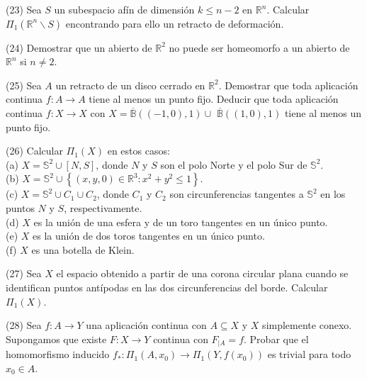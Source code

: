 \documentclass[
  a4paper,
  spanish,
  12pt,
]{scrartcl}
\begin{document}
\begin{ejer}
(23) Sea $S$ un subespacio afín de dimensión $k \leq n-2$ en $\mathbb{R}^{n}$. Calcular $\Pi_{1}\left(\mathbb{R}^{n} \backslash S\right)$ encontrando para ello un retracto de deformación.\\
\end{ejer}

\begin{ejer}
(24) Demostrar que un abierto de $\mathbb{R}^{2}$ no puede ser homeomorfo a un abierto de $\mathbb{R}^{n}$ si $n \neq 2$.\\
\end{ejer}

\begin{ejer}
(25) Sea $A$ un retracto de un disco cerrado en $\mathbb{R}^{2}$. Demostrar que toda aplicación continua $f: A \rightarrow A$ tiene al menos un punto fijo. Deducir que toda aplicación continua $f: X \rightarrow X$ con $X=\overline{\mathbb{B}}((-1,0), 1) \cup$ $\overline{\mathbb{B}}((1,0), 1)$ tiene al menos un punto fijo.\\
\end{ejer}

\begin{ejer}
(26) Calcular $\Pi_{1}(X)$ en estos casos:\\
(a) $X=\mathbb{S}^{2} \cup[N, S]$, donde $N$ y $S$ son el polo Norte y el polo Sur de $\mathbb{S}^{2}$.\\
(b) $X=\mathbb{S}^{2} \cup\left\{(x, y, 0) \in \mathbb{R}^{3}: x^{2}+y^{2} \leq 1\right\}$.\\
(c) $X=\mathbb{S}^{2} \cup C_{1} \cup C_{2}$, donde $C_{1}$ y $C_{2}$ son circunferencias tangentes a $\mathbb{S}^{2}$ en los puntos $N$ y $S$, respectivamente.\\
(d) $X$ es la unión de una esfera y de un toro tangentes en un único punto.\\
(e) $X$ es la unión de dos toros tangentes en un único punto.\\
(f) $X$ es una botella de Klein.\\
\end{ejer}

\begin{ejer}
(27) Sea $X$ el espacio obtenido a partir de una corona circular plana cuando se identifican puntos antípodas en las dos circunferencias del borde. Calcular $\Pi_{1}(X)$.\\
\end{ejer}

\begin{ejer}
(28) Sea $f: A \rightarrow Y$ una aplicación continua con $A \subseteq X$ y $X$ simplemente conexo. Supongamos que existe $F: X \rightarrow Y$ continua con $F_{\mid A}=f$. Probar que el homomorfismo inducido $f_{*}: \Pi_{1}\left(A, x_{0}\right) \rightarrow \Pi_{1}\left(Y, f\left(x_{0}\right)\right)$ es trivial para todo $x_{0} \in A$.\\
\end{ejer}
\end{document}
